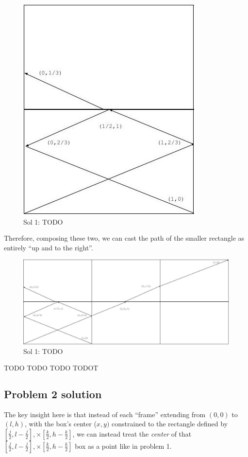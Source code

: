 \documentclass[11pt, oneside]{article} 	%
\begin{document}
\begin{figure}[!htb]
\centering
\includegraphics[scale=.5]{mirrorup}
 \caption{Sol 1: TODO}
\end{figure}

Therefore, composing these two, we can cast the path of the smaller rectangle as entirely ``up and to the right''.  

\begin{figure}[!htb]
\centering
\includegraphics[scale=.4]{fullpath}
 \caption{Sol 1: TODO}
\end{figure}




TODO TODO TODO TODOT

\subsection{Problem 2 solution}

The key insight here is that instead of each ``frame'' extending from $(0, 0)$ to $(l, h)$, with the box's center ($x, y)$ constrained to the rectangle defined by $[\frac{j}{2}, l - \frac{j}{2}], \times [\frac{k}{2}, h - \frac{k}{2}]$, we can instead treat the \emph{center} of that $[\frac{j}{2}, l - \frac{j}{2}], \times [\frac{k}{2}, h - \frac{k}{2}]$ box as a point like in problem 1.  
\end{document}
